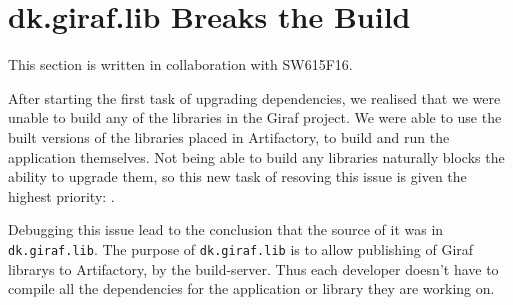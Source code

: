 \section{dk.giraf.lib Breaks the Build}
This section is written in collaboration with SW615F16.

After starting the first task of upgrading dependencies, we realised that we were unable to build any of the libraries in the Giraf project. 
We were able to use the built versions of the libraries placed in Artifactory, to build and run the application themselves. 
Not being able to build any libraries naturally blocks the ability to upgrade them, so this new task of resoving this issue is given the highest priority: \pblocking. 

Debugging this issue lead to the conclusion that the source of it was in \texttt{dk.giraf.lib}.
The purpose of \texttt{dk.giraf.lib} is to allow publishing of Giraf librarys to Artifactory, by the build-server.
Thus each developer doesn't have to compile all the dependencies for the application or library they are working on. 

